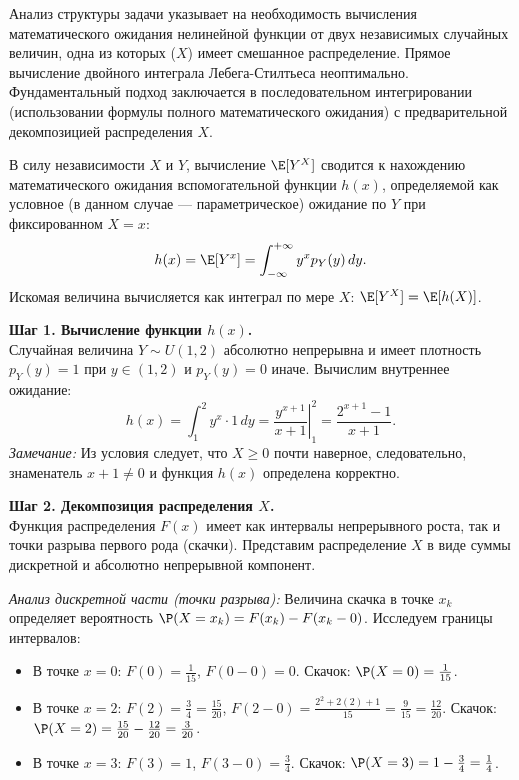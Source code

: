 \begin{Solution}
Анализ структуры задачи указывает на необходимость вычисления математического ожидания нелинейной функции от двух независимых случайных величин, одна из которых ($X$) имеет смешанное распределение. Прямое вычисление двойного интеграла Лебега-Стилтьеса неоптимально. Фундаментальный подход заключается в последовательном интегрировании (использовании формулы полного математического ожидания) с предварительной декомпозицией распределения $X$.

\begin{MethodBox}
В силу независимости $X$ и $Y$, вычисление $\E[Y^X]$ сводится к нахождению математического ожидания вспомогательной функции $h(x)$, определяемой как условное (в данном случае — параметрическое) ожидание по $Y$ при фиксированном $X=x$:
\[
h(x) = \E[Y^x] = \int_{-\infty}^{+\infty} y^x p_Y(y) \, dy.
\]
Искомая величина вычисляется как интеграл по мере $X$: $\E[Y^X] = \E[h(X)]$.
\end{MethodBox}

\textbf{Шаг 1. Вычисление функции $h(x)$.} \\
Случайная величина $Y \sim U(1, 2)$ абсолютно непрерывна и имеет плотность $p_Y(y) = 1$ при $y \in (1, 2)$ и $p_Y(y) = 0$ иначе. Вычислим внутреннее ожидание:
\[
h(x) = \int_{1}^{2} y^x \cdot 1 \, dy = \left. \frac{y^{x+1}}{x+1} \right|_{1}^{2} = \frac{2^{x+1} - 1}{x+1}.
\]
\textit{Замечание:} Из условия следует, что $X \geqslant 0$ почти наверное, следовательно, знаменатель $x+1 \neq 0$ и функция $h(x)$ определена корректно.

\textbf{Шаг 2. Декомпозиция распределения $X$.} \\
Функция распределения $F(x)$ имеет как интервалы непрерывного роста, так и точки разрыва первого рода (скачки). Представим распределение $X$ в виде суммы дискретной и абсолютно непрерывной компонент.

\textit{Анализ дискретной части (точки разрыва):}
Величина скачка в точке $x_k$ определяет вероятность $\P(X = x_k) = F(x_k) - F(x_k - 0)$.
Исследуем границы интервалов:
\begin{itemize}
    \item В точке $x = 0$: $F(0) = \frac{1}{15}$, $F(0-0) = 0$. Скачок: $\P(X = 0) = \frac{1}{15}$.
    \item В точке $x = 2$: $F(2) = \frac{3}{4} = \frac{15}{20}$, $F(2-0) = \frac{2^2+2(2)+1}{15} = \frac{9}{15} = \frac{12}{20}$. Скачок: $\P(X = 2) = \frac{15}{20} - \frac{12}{20} = \frac{3}{20}$.
    \item В точке $x = 3$: $F(3) = 1$, $F(3-0) = \frac{3}{4}$. Скачок: $\P(X = 3) = 1 - \frac{3}{4} = \frac{1}{4}$.
\end{itemize}


\end{Solution}
